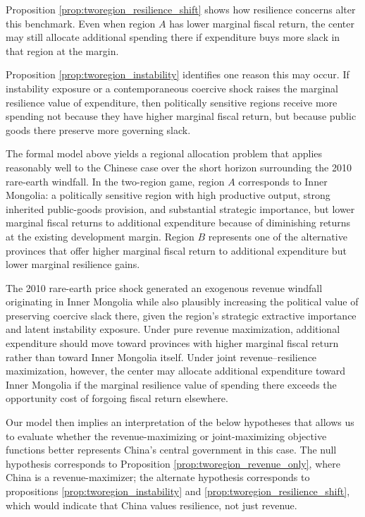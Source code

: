 \documentclass[12pt]{article}
\begin{document}
Proposition \ref{prop:tworegion_resilience_shift} shows how resilience concerns alter this benchmark. Even when region $A$ has lower marginal fiscal return, the center may still allocate additional spending there if expenditure buys more slack in that region at the margin.

Proposition \ref{prop:tworegion_instability} identifies one reason this may occur. If instability exposure or a contemporaneous coercive shock raises the marginal resilience value of expenditure, then politically sensitive regions receive more spending not because they have higher marginal fiscal return, but because public goods there preserve more governing slack.

The formal model above yields a regional allocation problem that applies reasonably well to the Chinese case over the short horizon surrounding the 2010 rare-earth windfall. In the two-region game, region $A$ corresponds to Inner Mongolia: a politically sensitive region with high productive output, strong inherited public-goods provision, and substantial strategic importance, but lower marginal fiscal returns to additional expenditure because of diminishing returns at the existing development margin. Region $B$ represents one of the alternative provinces that offer higher marginal fiscal return to additional expenditure but lower marginal resilience gains.

The 2010 rare-earth price shock generated an exogenous revenue windfall originating in Inner Mongolia while also plausibly increasing the political value of preserving coercive slack there, given the region's strategic extractive importance and latent instability exposure. Under pure revenue maximization, additional expenditure should move toward provinces with higher marginal fiscal return rather than toward Inner Mongolia itself. Under joint revenue--resilience maximization, however, the center may allocate additional expenditure toward Inner Mongolia if the marginal resilience value of spending there exceeds the opportunity cost of forgoing fiscal return elsewhere.

Our model then implies an interpretation of the below hypotheses that allows us to evaluate whether the revenue-maximizing or joint-maximizing objective functions better represents China's central government in this case. The null hypothesis corresponds to Proposition \ref{prop:tworegion_revenue_only}, where China is a revenue-maximizer; the alternate hypothesis corresponds to propositions \ref{prop:tworegion_instability} and \ref{prop:tworegion_resilience_shift}, which would indicate that China values resilience, not just revenue.
\end{document}
